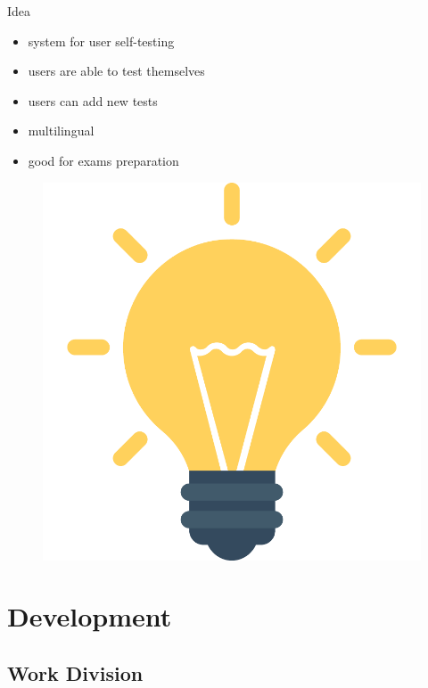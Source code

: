 \documentclass[]{beamer}
\begin{document}
    \begin{frame}{Idea}
      \begin{multicols}{2}
        \begin{itemize}
          \item system for user self-testing
          \item users are able to test themselves
          \item users can add new tests
          \item multilingual
          \item good for exams preparation
        \end{itemize}

        \columnbreak

        \begin{figure}[H]
          \includegraphics[width=.35\textwidth,height=.35\textheight,keepaspectratio]{img/idea.pdf}
        \end{figure}
      \end{multicols}
    \end{frame}

\section[Development]{Development}

  \subsection{Work Division}
\end{document}

